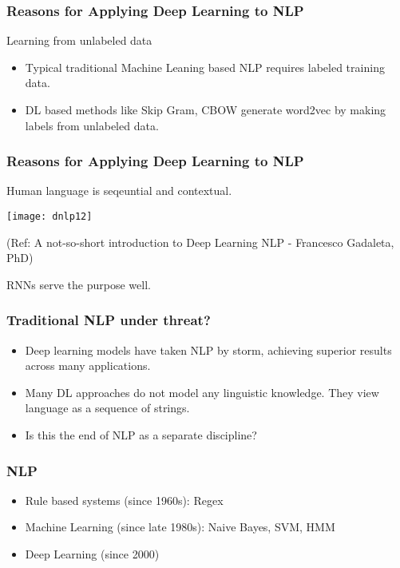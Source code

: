 \begin{frame}[fragile]\frametitle{Reasons for Applying Deep Learning to NLP}
Learning from unlabeled data

	\begin{itemize}
	\item Typical traditional Machine Leaning based NLP requires labeled training data.
	\item DL based methods like Skip Gram, CBOW generate word2vec by making labels from unlabeled data.
	\end{itemize}

\end{frame}


\begin{frame}[fragile]\frametitle{Reasons for Applying Deep Learning to NLP}
Human language is seqeuntial and contextual.

\begin{center}
\texttt{[image: dnlp12]}

\tiny{(Ref:  A not-so-short introduction to Deep Learning NLP - Francesco Gadaleta, PhD)}
\end{center}

 RNNs serve the purpose well.
\end{frame}


\begin{frame}[fragile]\frametitle{Traditional NLP under threat?}
	\begin{itemize}
	\item Deep learning models have taken NLP by storm, achieving superior results across many applications.
	\item Many DL approaches do not model any  linguistic knowledge. They view language as a sequence of strings.
	\item Is this the end of NLP as a separate discipline?
	\end{itemize}

\end{frame}

\begin{frame}[fragile]\frametitle{NLP}
	\begin{itemize}
	\item Rule based systems (since 1960s): Regex
	\item   Machine Learning (since late 1980s): Naive Bayes, SVM, HMM
	\item Deep Learning (since 2000)
	\end{itemize}

\end{frame}


